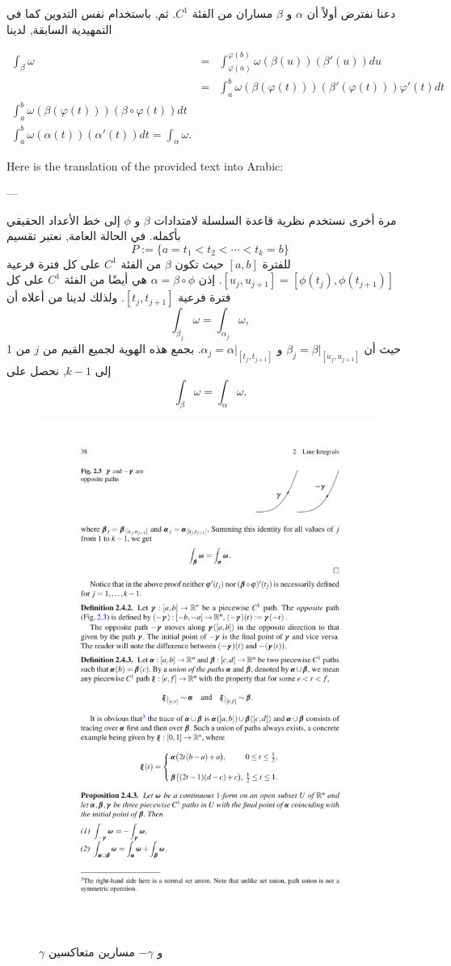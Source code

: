 \begin{demonstration}
    
دعنا نفترض أولاً أن \( \alpha \) و \( \beta \) مساران من الفئة \( C^1 \). ثم, باستخدام نفس التدوين كما في التمهيدية السابقة, لدينا

\begin{eqnarray*}
    \int_{\beta} \omega &=&  \int_{\varphi(a)}^{\varphi(b)} \omega(\beta(u)) (\beta'(u)) du
    \\
    &=&  \int_{a}^b  \omega(\beta(\varphi(t))) (\beta'(\varphi(t))) \varphi'(t) dt
    \\
    \int_{a}^b  \omega(\beta(\varphi(t))) (\beta \circ \varphi(t)) dt
    \\
    \int_{a}^b  \omega(\alpha(t)) (\alpha'(t)) dt = \int_{\alpha} \omega.
\end{eqnarray*}

Here is the translation of the provided text into Arabic:

---

مرة أخرى نستخدم نظرية قاعدة السلسلة لامتدادات \( \beta \) و \( \phi \) إلى خط الأعداد الحقيقي بأكمله. في الحالة العامة, نعتبر تقسيم
\[ P := \{a = t_1 < t_2 < \cdots < t_k = b\} \]
للفترة $[a, b]$ حيث تكون \( \beta \) من الفئة \( C^1 \) على كل فترة فرعية $[u_j, u_{j+1}] = [\phi(t_j), \phi(t_{j+1})]$. إذن \( \alpha = \beta \circ \phi \) هي أيضًا من الفئة \( C^1 \) على كل فترة فرعية $[t_j, t_{j+1}]$. ولذلك لدينا من أعلاه أن
\[ \int_{\beta_j} \omega = \int_{\alpha_j} \omega, \]
حيث أن \( \beta_j = \beta|_{[u_j, u_{j+1}]} \) و \( \alpha_j = \alpha|_{[t_j, t_{j+1}]} \). بجمع هذه الهوية لجميع القيم من \( j \) من 1 إلى \( k - 1 \), نحصل على
\[ \int_\beta \omega = \int_\alpha \omega. \]
\end{demonstration}

\begin{figure}
    \centering
    \includegraphics[width=0.5\linewidth]{opposit paths.pdf}
    \caption{$\gamma$ و  $-\gamma$ مسارين متعاكسين}
    \label{fig:enter-label}
\end{figure}

